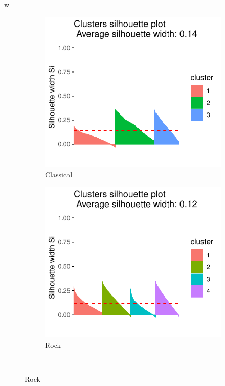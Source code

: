w\documentclass[11pt, oneside]{article}
\begin{document}
\begin{figure}[h]
\centering  
\begin{subfigure}[b]{0.5\textwidth}
        \includegraphics[width=\textwidth]{class_silplot.pdf} 
        \caption{Classical}
    \end{subfigure}%
    \begin{subfigure}[b]{0.5\textwidth}
        \includegraphics[width=\textwidth]{rock_silplot.pdf} 
        \caption{Rock}
    \end{subfigure} \\

\end{figure}
\end{document}
